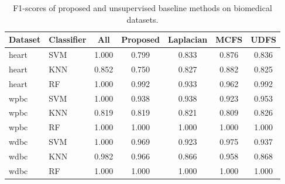 \begin{table}[ht]
\centering
\caption{F1-scores of proposed and unsupervised baseline methods on biomedical datasets.}
\label{tab:unsup_comparison}
\begin{tabular}{l|l|ccccc}
Dataset & Classifier & All & Proposed & Laplacian & MCFS & UDFS \\
\hline
heart & SVM & 1.000 & 0.799 & 0.833 & 0.876 & 0.836 \\
heart & KNN & 0.852 & 0.750 & 0.827 & 0.882 & 0.825 \\
heart & RF & 1.000 & 0.992 & 0.933 & 0.962 & 0.992 \\
wpbc & SVM & 1.000 & 0.938 & 0.938 & 0.923 & 0.953 \\
wpbc & KNN & 0.819 & 0.819 & 0.821 & 0.809 & 0.826 \\
wpbc & RF & 1.000 & 1.000 & 1.000 & 1.000 & 1.000 \\
wdbc & SVM & 1.000 & 0.969 & 0.923 & 0.975 & 0.937 \\
wdbc & KNN & 0.982 & 0.966 & 0.866 & 0.958 & 0.868 \\
wdbc & RF & 1.000 & 1.000 & 1.000 & 1.000 & 1.000 \\
\end{tabular}
\end{table}
